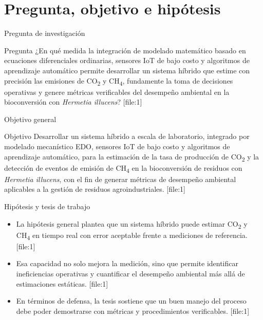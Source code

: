 \documentclass[10pt,aspectratio=169]{beamer}
\newcommand{\basecite}{\hfill{\color{griscita}\tiny [file:1]}}
\begin{document}
\section{Pregunta, objetivo e hipótesis}

\begin{frame}{Pregunta de investigación}
\justifying
\begin{block}{Pregunta}
¿En qué medida la integración de modelado matemático basado en ecuaciones diferenciales ordinarias, sensores IoT de bajo costo y algoritmos de aprendizaje automático permite desarrollar un sistema híbrido que estime con precisión las emisiones de CO\textsubscript{2} y CH\textsubscript{4}, fundamente la toma de decisiones operativas y genere métricas verificables del desempeño ambiental en la bioconversión con \textit{Hermetia illucens}? \basecite
\end{block}
\end{frame}

\begin{frame}{Objetivo general}
\justifying
\begin{block}{Objetivo}
Desarrollar un sistema híbrido a escala de laboratorio, integrado por modelado mecanístico EDO, sensores IoT de bajo costo y algoritmos de aprendizaje automático, para la estimación de la tasa de producción de CO\textsubscript{2} y la detección de eventos de emisión de CH\textsubscript{4} en la bioconversión de residuos con \textit{Hermetia illucens}, con el fin de generar métricas de desempeño ambiental aplicables a la gestión de residuos agroindustriales. \basecite
\end{block}
\end{frame}

\begin{frame}{Hipótesis y tesis de trabajo}
\justifying
\begin{itemize}
    \item La hipótesis general plantea que un sistema híbrido puede estimar CO\textsubscript{2} y CH\textsubscript{4} en tiempo real con error aceptable frente a mediciones de referencia. \basecite
    \item Esa capacidad no solo mejora la medición, sino que permite identificar ineficiencias operativas y cuantificar el desempeño ambiental más allá de estimaciones estáticas. \basecite
    \item En términos de defensa, la tesis sostiene que un buen manejo del proceso debe poder demostrarse con métricas y procedimientos verificables. \basecite
\end{itemize}
\end{frame}
\end{document}
